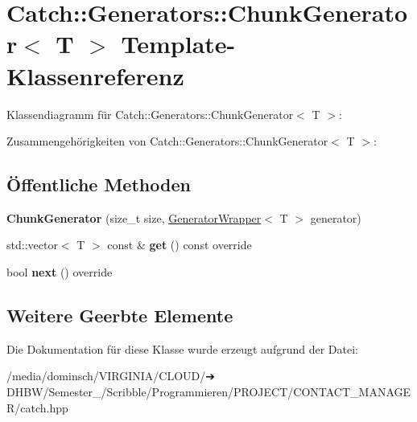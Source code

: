 \hypertarget{classCatch_1_1Generators_1_1ChunkGenerator}{}\section{Catch\+:\+:Generators\+:\+:Chunk\+Generator$<$ T $>$ Template-\/\+Klassenreferenz}
\label{classCatch_1_1Generators_1_1ChunkGenerator}


Klassendiagramm für Catch\+:\+:Generators\+:\+:Chunk\+Generator$<$ T $>$\+:


Zusammengehörigkeiten von Catch\+:\+:Generators\+:\+:Chunk\+Generator$<$ T $>$\+:
\subsection*{Öffentliche Methoden}
\begin{DoxyCompactItemize}
\item 
\mbox{\label{classCatch_1_1Generators_1_1ChunkGenerator_a50c334d00cde3166d71e9b90ebc2d2e3}} 
{\bfseries Chunk\+Generator} (size\+\_\+t size, \hyperlink{classCatch_1_1Generators_1_1GeneratorWrapper}{Generator\+Wrapper}$<$ T $>$ generator)
\item 
\mbox{\label{classCatch_1_1Generators_1_1ChunkGenerator_aa41c7d08a165b6a18560f2ab9e977f0b}} 
std\+::vector$<$ T $>$ const  \& {\bfseries get} () const override
\item 
\mbox{\label{classCatch_1_1Generators_1_1ChunkGenerator_a545e89f80eb1e3c953491541ea083f86}} 
bool {\bfseries next} () override
\end{DoxyCompactItemize}
\subsection*{Weitere Geerbte Elemente}


Die Dokumentation für diese Klasse wurde erzeugt aufgrund der Datei\+:\begin{DoxyCompactItemize}
\item 
/media/dominsch/\+V\+I\+R\+G\+I\+N\+I\+A/\+C\+L\+O\+U\+D/➔ D\+H\+B\+W/\+Semester\+\_/\+Scribble/\+Programmieren/\+P\+R\+O\+J\+E\+C\+T/\+C\+O\+N\+T\+A\+C\+T\+\_\+\+M\+A\+N\+A\+G\+E\+R/catch.\+hpp\end{DoxyCompactItemize}
